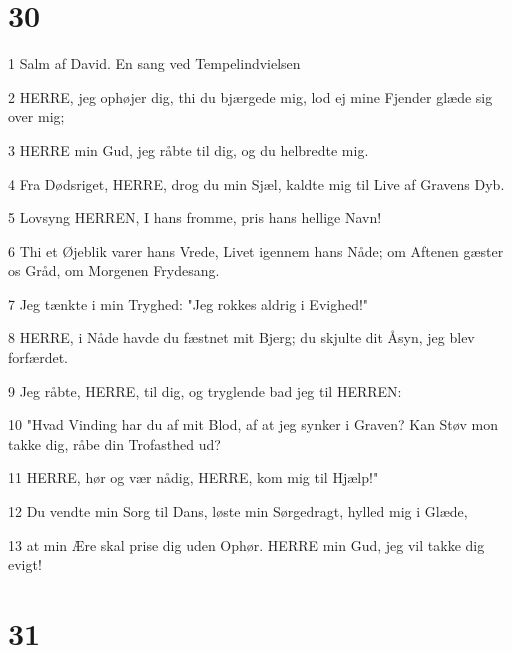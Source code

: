 \chapter{30}

\par 1 Salm af David. En sang ved Tempelindvielsen
\par 2 HERRE, jeg ophøjer dig, thi du bjærgede mig, lod ej mine Fjender glæde sig over mig;
\par 3 HERRE min Gud, jeg råbte til dig, og du helbredte mig.
\par 4 Fra Dødsriget, HERRE, drog du min Sjæl, kaldte mig til Live af Gravens Dyb.
\par 5 Lovsyng HERREN, I hans fromme, pris hans hellige Navn!
\par 6 Thi et Øjeblik varer hans Vrede, Livet igennem hans Nåde; om Aftenen gæster os Gråd, om Morgenen Frydesang.
\par 7 Jeg tænkte i min Tryghed: "Jeg rokkes aldrig i Evighed!"
\par 8 HERRE, i Nåde havde du fæstnet mit Bjerg; du skjulte dit Åsyn, jeg blev forfærdet.
\par 9 Jeg råbte, HERRE, til dig, og tryglende bad jeg til HERREN:
\par 10 "Hvad Vinding har du af mit Blod, af at jeg synker i Graven? Kan Støv mon takke dig, råbe din Trofasthed ud?
\par 11 HERRE, hør og vær nådig, HERRE, kom mig til Hjælp!"
\par 12 Du vendte min Sorg til Dans, løste min Sørgedragt, hylled mig i Glæde,
\par 13 at min Ære skal prise dig uden Ophør. HERRE min Gud, jeg vil takke dig evigt!

\chapter{31}

